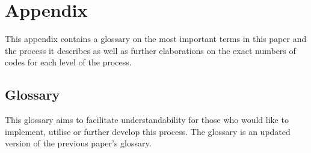 \documentclass{bausteinefdm}
\begin{document}


 \iftrue

\appendix

\section{Appendix}
\label{Appendix}

This appendix contains a glossary on the most important terms in this paper and the process it describes as well as further elaborations on the exact numbers of codes for each level of the process.

\subsection{Glossary}
\label{Glossary}


This glossary aims to facilitate understandability for those who would like to implement, utilise or further develop this process.
The glossary is an updated version of the previous paper's glossary. \cite{Hamann.2024b}
\end{document}
